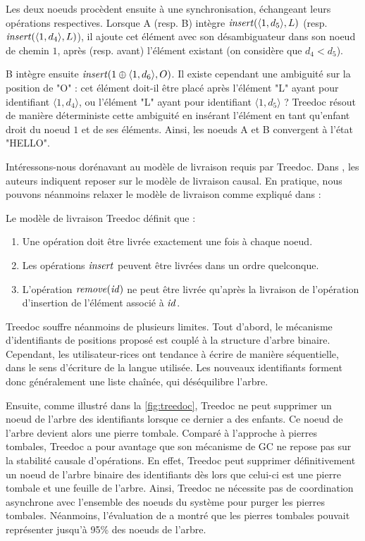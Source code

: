 Les deux noeuds procèdent ensuite à une synchronisation, échangeant leurs opérations respectives.
Lorsque A (resp. B) intègre $\mathit{insert}(\langle 1,d_5 \rangle, L)$ (resp. $\mathit{insert}(\langle 1,d_4 \rangle, L)$), il ajoute cet élément avec son désambiguateur dans son noeud de chemin $1$, après (resp. avant) l'élément existant (on considère que $d_4 < d_5$).

B intègre ensuite $\mathit{insert}(1 \oplus \langle 1,d_6 \rangle, O)$.
Il existe cependant une ambiguité sur la position de "O" : cet élément doit-il être placé après l'élément "L" ayant pour identifiant $\langle 1,d_4 \rangle$, ou l'élément "L" ayant pour identifiant $\langle 1,d_5 \rangle$ ?
Treedoc résout de manière déterministe cette ambiguité en insérant l'élément en tant qu'enfant droit du noeud $1$ et de ses éléments.
Ainsi, les noeuds A et B convergent à l'état "HELLO".

Intéressons-nous dorénavant au modèle de livraison requis par Treedoc.
Dans \cite{2009-treedoc-preguica}, les auteurs indiquent reposer sur le modèle de livraison causal.
En pratique, nous pouvons néanmoins relaxer le modèle de livraison comme expliqué dans \cite{2021-these-vic} :
\begin{definition}
  Le modèle de livraison Treedoc définit que :
  \begin{enumerate}
    \item Une opération doit être livrée exactement une fois à chaque noeud.
    \item Les opérations $\mathit{insert}$ peuvent être livrées dans un ordre quelconque.
    \item L'opération $\mathit{remove}(\mathit{id})$ ne peut être livrée qu'après la livraison de l'opération d'insertion de l'élément associé à $\mathit{id}$.
  \end{enumerate}
\end{definition}

Treedoc souffre néanmoins de plusieurs limites.
Tout d'abord, le mécanisme d'identifiants de positions proposé est couplé à la structure d'arbre binaire.
Cependant, les utilisateur-rices ont tendance à écrire de manière séquentielle, \ie dans le sens d'écriture de la langue utilisée.
Les nouveaux identifiants forment donc généralement une liste chaînée, qui déséquilibre l'arbre.

Ensuite, comme illustré dans la \autoref{fig:treedoc}, Treedoc ne peut supprimer un noeud de l'arbre des identifiants lorsque ce dernier a des enfants.
Ce noeud de l'arbre devient alors une pierre tombale.
Comparé à l'approche à pierres tombales, Treedoc a pour avantage que son mécanisme de \ac{GC} ne repose pas sur la stabilité causale d'opérations.
En effet, Treedoc peut supprimer définitivement un noeud de l'arbre binaire des identifiants dès lors que celui-ci est une pierre tombale et une feuille de l'arbre.
Ainsi, Treedoc ne nécessite pas de coordination asynchrone avec l'ensemble des noeuds du système pour purger les pierres tombales.
Néanmoins, l'évaluation de \cite{2009-treedoc-preguica} a montré que les pierres tombales pouvait représenter jusqu'à 95\% des noeuds de l'arbre.

